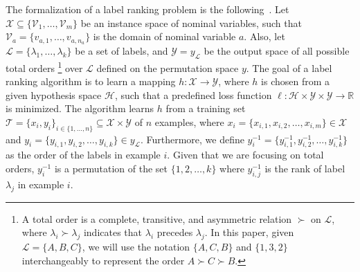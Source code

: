 \documentclass[a4paper,twoside,12pt,openright,notitlepage]{report}\usepackage[]{graphicx}\usepackage[]{color}
\begin{document}


The formalization of a label ranking problem is the following~\citep{vembu2009}. Let $\mathcal{X} \subseteq \{\mathcal{V}_1,\ldots,\mathcal{V}_m\}$ be an instance space of nominal variables, such that $\mathcal{V}_a=\{v_{a,1}, \ldots, v_{a,n_a}\}$ is the domain of nominal variable $a$.  Also, let $\mathcal{L} = \{\lambda_1,\ldots,\lambda_k\}$ be a set of labels, and $\mathcal{Y} = y_{\mathcal{L}}$ be the output space of all possible total orders%
\footnote{A total order is a complete, transitive, and asymmetric relation $\succ$ on $\mathcal{L}$, where $\lambda_i \succ \lambda_j$ indicates that $\lambda_i$ precedes $\lambda_j$. In this paper, given $\mathcal{L}=\{A,B,C\}$, we will use the notation $\{A,C,B\}$ and $\{1,3,2\}$ interchangeably to represent the order $A \succ C \succ B$.} over $\mathcal{L}$ defined on the permutation space $y$. The goal of a label ranking algorithm is to learn a mapping $h: \mathcal{X} \rightarrow \mathcal{Y}$, where $h$ is chosen from a given hypothesis space $\mathcal{H}$, such that a predefined loss function $\ell: \mathcal{H} \times \mathcal{Y} \times \mathcal{Y} \rightarrow \mathbb{R}$ is minimized. The algorithm learns $h$ from a training set $\mathcal{T}=\{x_i,y_i\}_{i \in \{1, \ldots, n\}} \subseteq \mathcal{X} \times \mathcal{Y}$ of $n$ examples, where $x_i = \{x_{i,1}, x_{i,2}, \ldots, x_{i,m} \} \in \mathcal{X}$ and $ y_i = \{y_{i,1}, y_{i,2}, \dots, y_{i,k}\} \in y_{\mathcal{L}}$. Furthermore, we define $y_i^{-1} = \{y_{i,1}^{-1}, y_{i,2}^{-1}, \ldots, y_{i,k}^{-1}\}$ as the order of the labels in example $i$. Given that we are focusing on total orders, $y_i^{-1}$ is a permutation of the set $\{1, 2, \ldots, k\}$ where $y_{i,j}^{-1}$ is the rank of label $\lambda_j$ in example $i$.
\end{document}
